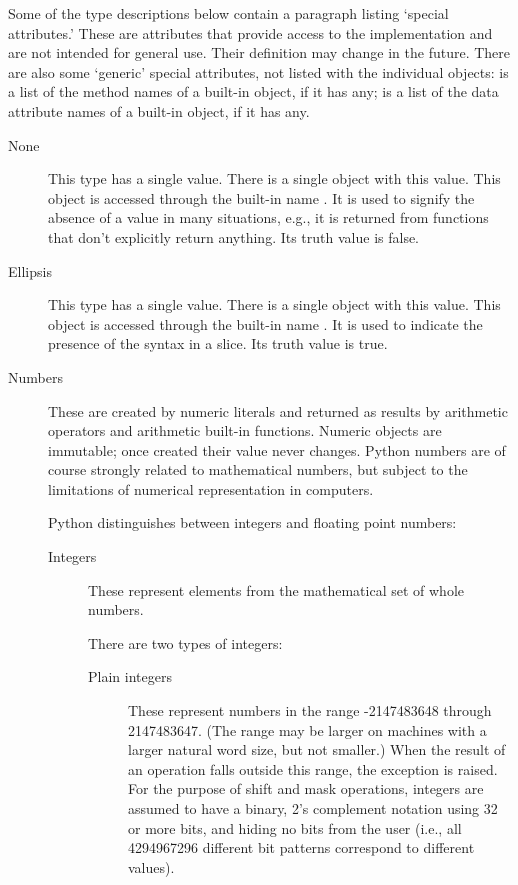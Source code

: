Some of the type descriptions below contain a paragraph listing
`special attributes.'  These are attributes that provide access to the
implementation and are not intended for general use.  Their definition
may change in the future.  There are also some `generic' special
attributes, not listed with the individual objects: 
is a list of the method names of a built-in object, if it has any;
 is a list of the data attribute names of a built-in
object, if it has any.

\begin{description}

\item[None]
This type has a single value.  There is a single object with this value.
This object is accessed through the built-in name .
It is used to signify the absence of a value in many situations, e.g.,
it is returned from functions that don't explicitly return anything.
Its truth value is false.

\item[Ellipsis]
This type has a single value.  There is a single object with this value.
This object is accessed through the built-in name .
It is used to indicate the presence of the  syntax in a
slice.  Its truth value is true.

\item[Numbers]
These are created by numeric literals and returned as results by
arithmetic operators and arithmetic built-in functions.  Numeric
objects are immutable; once created their value never changes.  Python
numbers are of course strongly related to mathematical numbers, but
subject to the limitations of numerical representation in computers.

Python distinguishes between integers and floating point numbers:

\begin{description}
\item[Integers]
These represent elements from the mathematical set of whole numbers.

There are two types of integers:

\begin{description}

\item[Plain integers]
These represent numbers in the range -2147483648 through 2147483647.
(The range may be larger on machines with a larger natural word
size, but not smaller.)
When the result of an operation falls outside this range, the
exception  is raised.
For the purpose of shift and mask operations, integers are assumed to
have a binary, 2's complement notation using 32 or more bits, and
hiding no bits from the user (i.e., all 4294967296 different bit
patterns correspond to different values).


\end{description}
\end{description}
\end{description}
